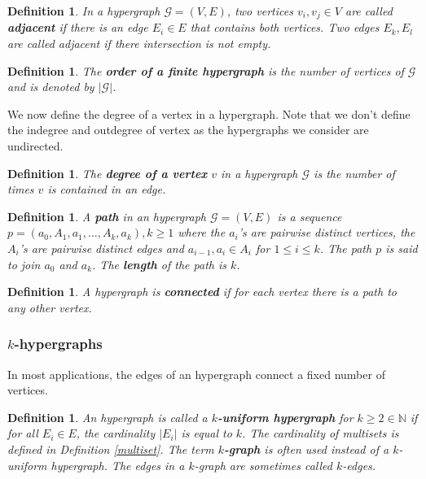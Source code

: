 \documentclass[a4paper,11pt]{report}
\newtheorem{definition}[theorem]{Definition}
\newcommand{\N}{{\mathbb N}}
\newcommand{\hgraf}{\mathcal{G}}
\begin{document}
\begin{definition}
  In a hypergraph $\hgraf=(V,E)$, two vertices $v_i, v_j \in V$ are called 
  \textbf{adjacent} if there is an edge $E_i \in E$ that contains both vertices. 
  Two edges $E_k, E_l$ are called adjacent if there intersection is not empty.
\end{definition}

\begin{definition}
  The \textbf{order of a finite hypergraph \hgraf} is the number of vertices of $\hgraf$ 
  and is denoted by $|\hgraf|$.
\end{definition}
We now define the degree of a vertex in a hypergraph. Note that we don't define 
the indegree and outdegree of vertex as the hypergraphs we consider are 
undirected.
\begin{definition}
The \textbf{degree of a vertex} $v$ in a hypergraph $\hgraf$ is the number of 
times $v$ is contained in an edge.
\end{definition}

\begin{definition}
A \textbf{path} in an hypergraph $\hgraf = (V,E)$ is a sequence $p = (a_0, A_1, a_1, \ldots, A_k, a_k), k \geq 1$ where the
$a_i$'s are pairwise distinct vertices, the $A_i$'s are pairwise distinct
edges and ${a_{i-1}, a_i} \in A_i$ for $1 \leq i \leq k$. The path $p$ is said 
to join $a_0$ and $a_k$. The \textbf{length} of the path is $k$.
\end{definition}

\begin{definition}
A hypergraph is \textbf{connected} if for each vertex there is a path to any 
other vertex.

\end{definition}
\subsubsection{$k$-hypergraphs}
In most applications, the edges of an hypergraph connect a fixed number of 
vertices. 
\begin{definition}
  An hypergraph is called a \textbf{$k$-uniform hypergraph} for $k \geq 2 \in \N$ if for all $E_i \in E$, 
  the cardinality $|E_i|$ is equal to $k$. The cardinality of multisets is defined in Definition \ref{multiset}.
  The term \textbf{$k$-graph} is often used 
  instead of a $k$-uniform hypergraph. The edges in a $k$-graph are sometimes 
  called $k$-edges.
\end{definition}
\end{document}
